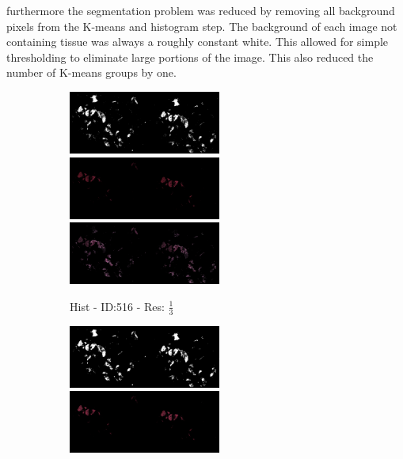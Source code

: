 \documentclass[letterpaper,10pt,oneside]{article}
\begin{document}
furthermore the segmentation problem was reduced by removing all background pixels from the K-means and histogram step. The background of each image not containing tissue was always a roughly constant white. This allowed for simple thresholding to eliminate large portions of the image. This also reduced the number of K-means groups by one.

\begin{figure}[hbtp]
  \centering
  \begin{subfigure}[b]{5cm}
    \includegraphics[width=5cm]{visualization/results/histogramSeg/res_reduce_3/Region_0_PO13-00516A1_1_7_201305171148.png}
    \includegraphics[width=5cm]{visualization/results/histogramSeg/res_reduce_3/Region_1_PO13-00516A1_1_7_201305171148.png}
    \includegraphics[width=5cm]{visualization/results/histogramSeg/res_reduce_3/Region_2_PO13-00516A1_1_7_201305171148.png}
    \caption{Hist - ID:516 - Res: $\frac{1}{3}$}
  \end{subfigure}
  \begin{subfigure}[b]{5cm}
    \includegraphics[width=5cm]{visualization/results/histogramSeg/res_reduce_4/Region_0_PO13-00516A1_1_7_201305171148.png}
    \includegraphics[width=5cm]{visualization/results/histogramSeg/res_reduce_4/Region_1_PO13-00516A1_1_7_201305171148.png}

\end{subfigure}
\end{figure}
\end{document}
